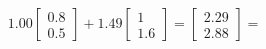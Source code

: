 \documentclass[preview]{standalone}
\begin{document}
\begin{align*}
1.00 \begin{bmatrix} 0.8 \\ 0.5 \end{bmatrix} + 1.49 \begin{bmatrix} 1 \\ 1.6 \end{bmatrix} = \begin{bmatrix} 2.29 \\ 2.88 \end{bmatrix} =
\end{align*}
\end{document}
